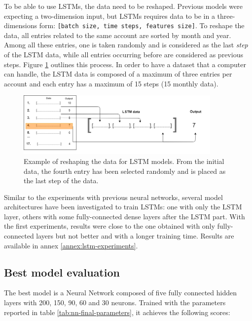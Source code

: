 To be able to use LSTMs, the data need to be reshaped. Previous models were expecting a two-dimension input, but LSTMs requires data to be in a three-dimensions form: \texttt{[batch size, time steps, features size]}. To reshape the data, all entries related to the same account are sorted by month and year. Among all these entries, one is taken randomly and is considered as the last \textit{step} of the LSTM data, while all entries occurring before are considered as previous steps. Figure \ref{fig:lst-data-build} outlines this process. In order to have a dataset that a computer can handle, the LSTM data is composed of a maximum of three entries per account and each entry has a maximum of 15 steps (15 monthly data).

\begin{figure}[htbp]
    \centering
    \includegraphics[width=10cm]{images/lstm-data-build.png}
    \caption[LSTM data build]{Example of reshaping the data for LSTM models. From the initial data, the fourth entry has been selected randomly and is placed as the last step of the data.}
    \label{fig:lst-data-build}
\end{figure}

Similar to the experiments with previous neural networks, several model architectures have been investigated to train LSTMs: one with only the LSTM layer, others with some fully-connected dense layers after the LSTM part. With the first experiments, results were close to the one obtained with only fully-connected layers but not better and with a longer training time. Results are available in annex \ref{annex:lstm-experiments}.



\subsection{Best model evaluation}
\label{sec:best-model}

The best model is a Neural Network composed of five fully connected hidden layers with 200, 150, 90, 60 and 30 neurons. Trained with the parameters reported in table \ref{tab:nn-final-parameters}, it achieves the following scores:

